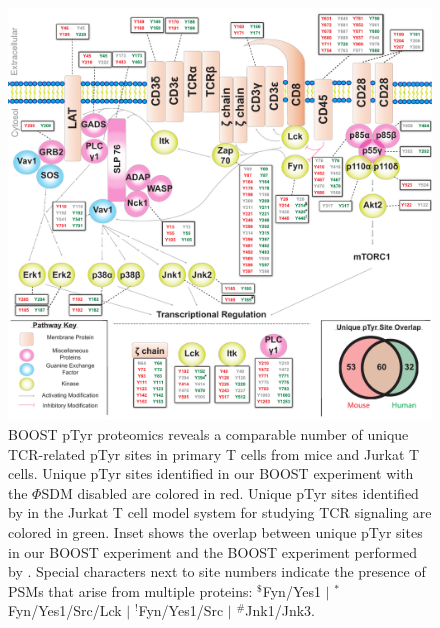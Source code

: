 \documentclass[journal=jprobs,manuscript=article]{achemso}
\begin{document}
\begin{figure}
\centering
\includegraphics[width=170mm]{figures/main_figs/biologically_interesting.pdf}
\caption{BOOST pTyr proteomics reveals a comparable number of unique TCR-related pTyr sites in primary T cells from mice and Jurkat T cells. Unique pTyr sites identified in our BOOST experiment with the $\Phi$SDM disabled are colored in red. Unique pTyr sites identified by \citeauthor{chua2020tandem} \citeyear{chua2020tandem} in the Jurkat T cell model system for studying TCR signaling are colored in green. Inset shows the overlap between unique pTyr sites in our BOOST experiment and the BOOST experiment performed by \citeauthor{chua2020tandem} \citeyear{chua2020tandem}. Special characters next to site numbers indicate the presence of PSMs that arise from multiple proteins:  $^{\textbf{\$}}$Fyn/Yes1 $|$ $^{\textbf{*}}$Fyn/Yes1/Src/Lck $|$ $^{\textbf{!}}$Fyn/Yes1/Src $|$ $^{\textbf{\#}}$Jnk1/Jnk3.  }\label{biologically_interesting}
\end{figure}
\end{document}
